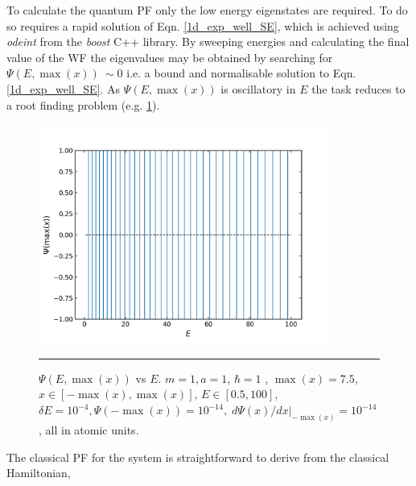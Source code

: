 \documentclass[../main.tex]{subfiles}
\begin{document}
To calculate the quantum PF only the low energy eigenstates are required. To do so requires a rapid solution of Eqn. \eqref{1d_exp_well_SE}, which is achieved using \emph{odeint} from the \emph{boost} C++ library.\cite{Ahnert2011} By sweeping energies and calculating the final value of the WF the eigenvalues may be obtained by searching for $\Psi(E, \max(x)) \ \sim 0$ i.e. a bound and normalisable solution to Eqn. \eqref{1d_exp_well_SE}. As $\Psi(E, \max(x))$ is oscillatory in $E$ the task reduces to a root finding problem (e.g. \figurename{ \ref{1d_exp_well_psi_max_vs_energy}}).

\begin{figure}[h!]
	\centering
	\includegraphics[height=7.2cm]{4/figs/1d_exp_well_psi_max_vs_energy}
	\vspace{0.2cm}
	\hrule
	\caption{$\Psi(E, \max(x))$ vs $E$. $m=1, a = 1$, $\hbar = 1$ , $\max(x) = 7.5$, $x \in [-\max(x), \max(x)]$, $E \in [0.5, 100]$, $\delta E = 10^{-4}, \Psi(-\!\max(x)) = 10^{-14},\; d\Psi(x)/dx|_{-\!\max(x)} = 10^{-14}$, all in atomic units.} 
	\label{1d_exp_well_psi_max_vs_energy}
\end{figure}
\newpage
The classical PF for the system is straightforward to derive from the classical Hamiltonian,
\end{document}
